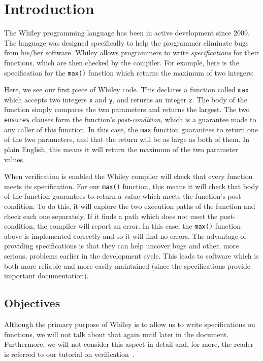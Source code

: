 \section{Introduction}
The Whiley programming language has been in active development since
2009.  The language was designed specifically to help the programmer
eliminate bugs from his/her software.  Whiley allows programmers to
write {\em specifications} for their functions, which are then checked
by the compiler.  For example, here is the specification for the
\lstinline{max()} function which returns the maximum of two integers:



Here, we see our first piece of Whiley code.  This declares a function
called \lstinline{max} which accepts two integers \lstinline{x} and
\lstinline{y}, and returns an integer \lstinline{z}.  The body of the
function simply compares the two parameters and returns the largest.
The two \lstinline{ensures} clauses form the function's {\em
  post-condition}, which is a guarantee made to any caller of this
function.  In this case, the \lstinline{max} function guarantees to
return one of the two parameters, and that the return will be as large
as both of them.  In plain English, this means it will return the
maximum of the two parameter values.

When verification is enabled the Whiley compiler will check that every
function meets its specification.  For our \lstinline{max()} function,
this means it will check that body of the function guarantees to
return a value which meets the function's post-condition.  To do this,
it will explore the two execution paths of the function and check each
one separately.  If it finds a path which does not meet the
post-condition, the compiler will report an error.  In this case, the
\lstinline{max()} function above is implemented correctly and so it
will find no errors.  The advantage of providing specifications is
that they can help uncover bugs and other, more serious, problems
earlier in the development cycle.  This leads to software which is
both more reliable and more easily maintained (since the
specifications provide important documentation).

\subsection{Objectives}

Although the primary purpose of Whiley is to allow us to write
specifications on functions, we will not talk about that again until
later in the document.  Furthermore, we will not consider this aspect
in detail and, for more, the reader is referred to our tutorial on
verification~\cite{Pea13x}.

